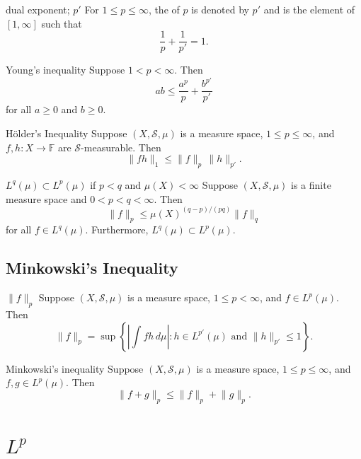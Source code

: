 \documentclass[../main.tex]{subfiles}
\begin{document}
\begin{definition}{dual exponent; $p'$}{}
For $1 \le p \le \infty$, the  of $p$ is denoted by $p'$ and is the element of $[1,\infty]$ such that
\[
\frac{1}{p} + \frac{1}{p'} = 1.
\]
\end{definition}

\begin{lemma}{Young's inequality}{}
    Suppose \(1 < p < \infty\). Then
\[
ab \le \frac{a^p}{p} + \frac{b^{p'}}{p'}
\]
for all \(a \ge 0\) and \(b \ge 0\).
\end{lemma}

\begin{theorem}{H\"older's Inequality}{}
Suppose \((X,\mathcal{S},\mu)\) is a measure space, \(1\leq p\leq \infty\), and \(f,h\colon X\to \mathbb{F}\) are \(\mathcal{S}\)-measurable. Then
\[
\lVert fh\rVert_{1}\leq \lVert f\rVert_{p}\,\lVert h\rVert_{p'}.
\]
\end{theorem}
\begin{theorem}{$L^{q}(\mu)\subset L^{p}(\mu)$ if $p<q$ and $\mu(X)<\infty$}{}
Suppose $(X,\mathcal{S},\mu)$ is a finite measure space and $0<p<q<\infty$. Then
\[
\lVert f\rVert_{p}\leq \mu(X)^{(q-p)/(pq)}\lVert f\rVert_{q}
\]
for all $f\in L^{q}(\mu)$. Furthermore, $L^{q}(\mu)\subset L^{p}(\mu)$.
\end{theorem}

\subsection*{Minkowski's Inequality}

\begin{theorem}{ $\|f\|_p$}{}
Suppose $(X,\mathcal{S},\mu)$ is a measure space, $1 \leq p < \infty$, and $f \in L^{p}(\mu)$. Then
\[
\|f\|_p
= \operatorname{sup} \left\{ \left| \int f h \, d\mu \right| : h \in L^{p'}(\mu) \text{ and } \|h\|_{p'} \leq 1 \right\}.
\]
\end{theorem}

\begin{theorem}{Minkowski's inequality}{}
Suppose \((X,\mathcal{S},\mu)\) is a measure space, \(1 \le p \le \infty\), and \(f,g \in L^{p}(\mu)\). Then
\[
\lVert f + g \rVert_{p} \le \lVert f \rVert_{p} + \lVert g \rVert_{p}.
\]
\end{theorem}

\section{\(  L^{p}  \) }
\end{document}
